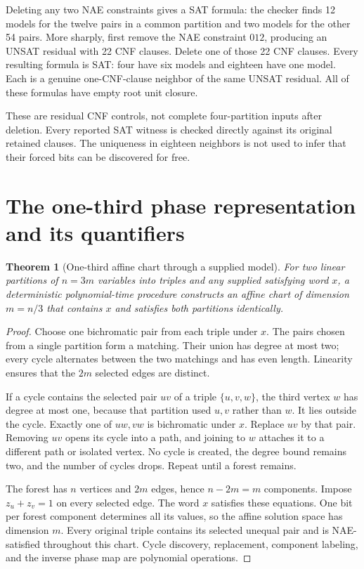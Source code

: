 \documentclass[11pt,letterpaper]{article}
\newtheorem{theorem}{Theorem}
\theoremstyle{definition}
\begin{document}
Deleting any two NAE constraints gives a SAT formula: the checker finds 12 models for the twelve pairs in a common partition and two models for the other 54 pairs. More sharply, first remove the NAE constraint $012$, producing an UNSAT residual with 22 CNF clauses. Delete one of those 22 CNF clauses. Every resulting formula is SAT: four have six models and eighteen have one model. Each is a genuine one-CNF-clause neighbor of the same UNSAT residual. All of these formulas have empty root unit closure.

These are residual CNF controls, not complete four-partition inputs after deletion. Every reported SAT witness is checked directly against its original retained clauses. The uniqueness in eighteen neighbors is not used to infer that their forced bits can be discovered for free.

\section{The one-third phase representation and its quantifiers}

\begin{theorem}[One-third affine chart through a supplied model]\label{thm:chart}
For two linear partitions of $n=3m$ variables into triples and any supplied satisfying word $x$, a deterministic polynomial-time procedure constructs an affine chart of dimension $m=n/3$ that contains $x$ and satisfies both partitions identically.
\end{theorem}
\begin{proof}
Choose one bichromatic pair from each triple under $x$. The pairs chosen from a single partition form a matching. Their union has degree at most two; every cycle alternates between the two matchings and has even length. Linearity ensures that the $2m$ selected edges are distinct.

If a cycle contains the selected pair $uv$ of a triple $\{u,v,w\}$, the third vertex $w$ has degree at most one, because that partition used $u,v$ rather than $w$. It lies outside the cycle. Exactly one of $uw,vw$ is bichromatic under $x$. Replace $uv$ by that pair. Removing $uv$ opens its cycle into a path, and joining to $w$ attaches it to a different path or isolated vertex. No cycle is created, the degree bound remains two, and the number of cycles drops. Repeat until a forest remains.

The forest has $n$ vertices and $2m$ edges, hence $n-2m=m$ components. Impose $z_u+z_v=1$ on every selected edge. The word $x$ satisfies these equations. One bit per forest component determines all its values, so the affine solution space has dimension $m$. Every original triple contains its selected unequal pair and is NAE-satisfied throughout this chart. Cycle discovery, replacement, component labeling, and the inverse phase map are polynomial operations.
\end{proof}
\end{document}
